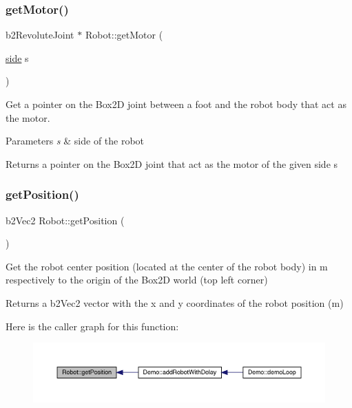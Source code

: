 \subsubsection{\texorpdfstring{get\+Motor()}{getMotor()}}
{\footnotesize\ttfamily b2\+Revolute\+Joint $\ast$ Robot\+::get\+Motor (\begin{DoxyParamCaption}\item[{\mbox{\hyperlink{_robot_8h_afc015eff6557e84151d2e53b94375445}{side}}}]{s }\end{DoxyParamCaption})}

Get a pointer on the Box2D joint between a foot and the robot body that act as the motor. 
\begin{DoxyParams}{Parameters}
{\em s} & side of the robot \\
\hline
\end{DoxyParams}
\begin{DoxyReturn}{Returns}
a pointer on the Box2D joint that act as the motor of the given side s 
\end{DoxyReturn}
\mbox{\label{class_robot_af8bdea28202e00ebf48187b8943b245c}} 
\subsubsection{\texorpdfstring{get\+Position()}{getPosition()}}
{\footnotesize\ttfamily b2\+Vec2 Robot\+::get\+Position (\begin{DoxyParamCaption}{ }\end{DoxyParamCaption})}

Get the robot center position (located at the center of the robot body) in m respectively to the origin of the Box2D world (top left corner) \begin{DoxyReturn}{Returns}
a b2\+Vec2 vector with the x and y coordinates of the robot position (m) 
\end{DoxyReturn}
Here is the caller graph for this function\+:\nopagebreak
\begin{figure}[H]
\begin{center}
\leavevmode
\includegraphics[width=350pt]{class_robot_af8bdea28202e00ebf48187b8943b245c_icgraph}
\end{center}
\end{figure}
\mbox{\label{class_robot_a65b9be1d9d45b004a6ea500dd5f85246}} 
